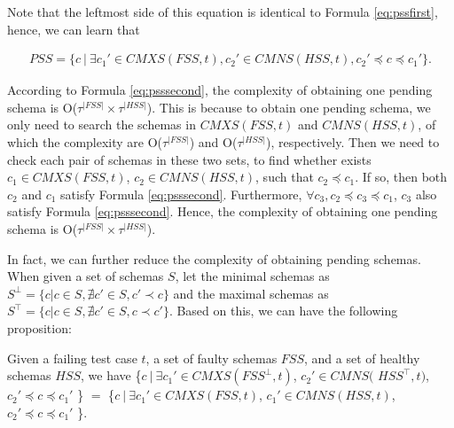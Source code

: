 {Note that the leftmost side of this equation is identical to Formula \ref{eq:pssfirst}, hence, we can learn that



\begin{equation}\label{eq:psssecond}
\begin{aligned}
PSS =  \{ c\ |\ \exists c_{1}' \in CMXS(FSS, t), c_{2}' \in CMNS(HSS, t),  c_{2}' \preceq c \preceq c_{1}' \}.
\end{aligned}
\end{equation}

According to Formula \ref{eq:psssecond}, the complexity of obtaining one pending schema is O($ \tau^{|FSS|} \times \tau^{|HSS|}$). This is because to obtain one pending schema, we only need to search the schemas in $CMXS(FSS, t)$ and $CMNS(HSS, t)$, of which the complexity are O($\tau^{|FSS|}$) and O($\tau^{|HSS|}$), respectively. Then we need to check each pair of schemas in these two sets, to find whether exists $c_{1} \in CMXS(FSS, t)$, $c_{2} \in CMNS(HSS, t)$, such that $c_{2} \preceq c_{1}$. If so, then both $c_{2}$ and $c_{1}$ satisfy Formula \ref{eq:psssecond}. Furthermore, $\forall c_{3}, c_{2} \preceq c_{3} \preceq c_{1}$, $c_{3}$ also satisfy Formula \ref{eq:psssecond}. Hence, the complexity of obtaining one pending schema is O($\tau^{|FSS|} \times \tau^{|HSS|}$).

In fact, we can further reduce the complexity of obtaining pending schemas. When given a set of schemas $S$, let the minimal schemas as $S^{\bot } = \{ c | c \in S, \nexists c' \in S, c' \prec c \}$ and the maximal schemas as $S^{\top } = \{ c | c \in S, \nexists c' \in S, c \prec c' \}$. Based on this, we can have the following proposition:

\begin{proposition}\label{pro:identicialPending}
Given a failing test case $t$, a set of faulty schemas $FSS$, and a set of healthy schemas $HSS$, we have \{$ c\ |\ \exists c_{1}' \in CMXS(FSS^{\bot}, t)$, $ c_{2}' \in CMNS($ $HSS^{\top}, t)$, $c_{2}' \preceq c \preceq c_{1}'$ \} $=$  \{$ c\ |\ \exists c_{1}' \in CMXS(FSS, t)$, $c_{1}' \in CMNS(HSS, t)$, $c_{2}' \preceq c \preceq c_{1}'$ \}.
\end{proposition}

}
